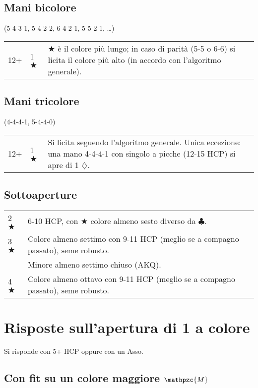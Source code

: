 \documentclass[a4paper,10pt]{article}
\renewcommand{\c}{$\clubsuit$\xspace}
\renewcommand{\d}{$\diamondsuit$\xspace}
\renewcommand{\j}{$\bigstar$\xspace}
\newcommand{\sa}{SA\xspace}
\newcommand{\M}{$\mathpzc{M}$\xspace}
\newcommand{\cfbox}[2]{%
    \colorlet{currentcolor}{.}%
    {\color{#1}%
    \fbox{\color{currentcolor}#2}}%
}
\newcommand{\alert}[1]{\cfbox{red}{#1}}
\newcommand{\smallspace}{\vskip0.3cm}
\newenvironment{twocol}
  {\smallspace\noindent\begin{tabular}{l p{0.78\textwidth}}}
  {\end{tabular}\smallspace}
\newenvironment{threecol}
  {\smallspace\noindent\begin{tabular}{l l p{0.78\textwidth}}}
  {\end{tabular}\smallspace}
\begin{document}
\subsection{Mani bicolore}
(5-4-3-1, 5-4-2-2, 6-4-2-1, 5-5-2-1, \dots)

\begin{threecol}
 12+ & 1 \j & \j è il colore più lungo; in caso di parità (5-5 o 6-6) si licita il colore più alto (in accordo con l'algoritmo generale).
\end{threecol}


\subsection{Mani tricolore}
(4-4-4-1, 5-4-4-0)

\begin{threecol}
 12+ & 1 \j & Si licita seguendo l'algoritmo generale. Unica eccezione: una mano 4-4-4-1 con singolo a picche (12-15 HCP) si apre di 1 \d.
\end{threecol}


\subsection{Sottoaperture}

\begin{twocol}
 2 \j & 6-10 HCP, con \j colore almeno sesto diverso da \c.\\
 3 \j & Colore almeno settimo con 9-11 HCP (meglio se a compagno passato), seme robusto.\\
 \alert{3 \sa} & Minore almeno settimo chiuso (AKQ).\\
 4 \j & Colore almeno ottavo con 9-11 HCP (meglio se a compagno passato), seme robusto.
\end{twocol}

\pagebreak

\section{Risposte sull'apertura di 1 a colore}

Si risponde con 5+ HCP oppure con un Asso.

\subsection{Con fit su un colore maggiore \M}

\end{document}
